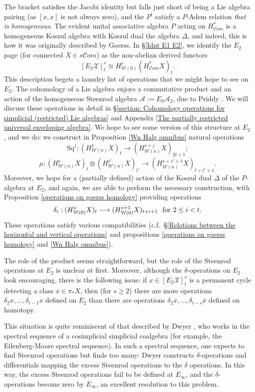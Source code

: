 \documentclass[11pt]{amsart} \renewcommand{\baselinestretch}{1.4}
\theoremstyle{plain}
\theoremstyle{definition}
\renewcommand{\to}{\longrightarrow}
\newcommand{\scrC}{\mathscr{C}}
\newcommand{\calA}{\mathcal{A}}
\newcommand{\calw}{\mathcal{W}}
\newcommand{\cala}{\mathcal{A}}
\newcommand{\calx}{\mathcal{X}}
\newcommand{\Sq}{\mathrm{Sq}}
\newcommand{\LieSteen}{\calA}
\newcommand{\algs}{{\scrC\!\textit{om}}}
\newcommand{\E}[5]{[E^{#1}_{#2}#3]^{#4}_{#5}}
\begin{document}
\begin{Introduction}
The bracket satisfies the Jacobi identity but falls just short of being a Lie algebra pairing (as $[x,x]$ is not always zero), and the $P^i$ satisfy a $P$-Adem relation \emph{that is homogeneous}. The evident unital associative algebra $P$ acting on $H^{*}_{\algs}$ is a homogeneous Koszul algebra with Koszul dual the algebra $\Delta$, and indeed, this is how it was originally described by Goerss. In \S\ref{Idnt E1 E2}, we identify the $E_2$ page (for connected $X\in s\algs$) as the  non-abelian derived functors
\[\E{}{2}{\calx}{s}{t}\cong H^{s}_{\calw(0)}(H^{*}_{\algs}X)_t.\]
This description begets a laundry list of operations that we might hope to see on $E_2$. The cohomology of a Lie algebra enjoys a commutative product and an action of the homogeneous Steenrod algebra $\LieSteen:=E_0\cala_2$, due to Priddy \cite{PriddySimplicialLie.pdf}. We will discuss these operations in detail in \S\ref{section: Cohomology operations for simplicial (restricted) Lie algebras} and Appendix \ref{The partially restricted universal enveloping algebra}. We hope to see some version of this structure at $E_2$, and we do: we construct in Proposition \ref{Wn Halg omnibus} natural operations
\[\Sq^j:(H^s_{\calw(n)}X)_t\to (H^{s+j}_{\calw(n)}X)_{2t+1};\]
\[\mu:(H^s_{\calw(n)}X)_t\otimes (H^{s'}_{\calw(n)}X)_{t'}\to (H^{s+s'+1}_{\calw(n)}X)_{t+t'+1}.\]
Moreover, we hope for a (partially defined) action of the Koszul dual $\Delta$ of the $P$-algebra at $E_2$, and again, we are able to perform the necessary construction, with
Proposition \ref{operations on goerss homology} providing operations 
\[\delta_i:(H^s_{\calw(0)}X)_t\to (H^{s+1}_{\calw(0)}X)_{t+i+1}\textup{ \ for $2\leq i <t$}.\] 
These operations satisfy various compatibilities (c.f.\ \S\ref{Relations between the horizontal and vertical operations} and propositions \ref{operations on goerss homology} and \ref{Wn Halg omnibus}).

The role of the product seems straightforward, but the role of the Steenrod operations at $E_2$ is unclear at first. Moreover, although the $\delta$-operations on $E_2$ look encouraging, there is the following issue: if $x\in \E{}{2}{\calx}{s}{t}$ is  a permanent cycle detecting  a class $\overline{x}\in \pi_*X$, then (for $s\geq2$) there are more operations $\delta_2x,\ldots,\delta_{t-1}x$ defined on $E_2$ than there are operations $\delta_2\overline{x},\ldots,\delta_{t-s}\overline{x}$ defined on homotopy. 

This situation is quite reminiscent of that described by Dwyer \cite{DwyerHigherDividedSquares.pdf}, who works in the spectral sequence of a cosimplicial simplicial coalgebra (for example, the Eilenberg-Moore spectral sequence). In such a spectral sequence, one expects to find Steenrod operations but finds too many: Dwyer constructs $\delta$-operations and differentials mapping the excess Steenrod operations to the $\delta$ operations. In this way, the excess Steenrod operations fail to be defined at $E_\infty$, and the $\delta$-operations become zero by $E_\infty$, an excellent resolution to this problem.


\end{Introduction}
\end{document}
